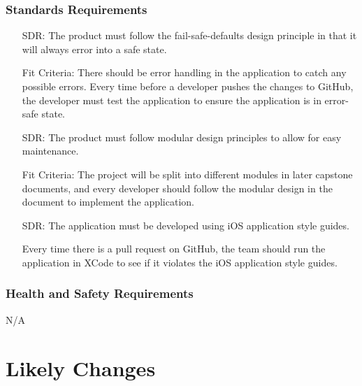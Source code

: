 \documentclass[12pt]{article}
\newcounter{reqnum} %
\newcounter{sdrreqnum} %
\begin{document}
\subsubsection{Standards Requirements}
\begin{itemize}
    \item[SDR\refstepcounter{sdrreqnum}\thesdrreqnum \label{R_Inputs}:] The product must follow the fail-safe-defaults design principle in that it will always error into a safe state.
    \item[] Fit Criteria: There should be error handling in the application to catch any possible errors. Every time before a developer pushes the changes to GitHub, the developer must test the application to ensure the application is in error-safe state.
    \item[SDR\refstepcounter{sdrreqnum}\thesdrreqnum \label{R_Inputs}:] The product must follow modular design principles to allow for easy maintenance.
    \item[] Fit Criteria: The project will be split into different modules in later capstone documents, and every developer should follow the modular design in the document to implement the application.
    \item[SDR\refstepcounter{sdrreqnum}\thesdrreqnum \label{R_Inputs}:] The application must be developed using iOS application style guides. 
    \item[] Every time there is a pull request on GitHub, the team should run the application in XCode to see if it violates the iOS application style guides.

\end{itemize}

\subsubsection{Health and Safety Requirements}
N/A

\section{Likely Changes}    
\end{document}
